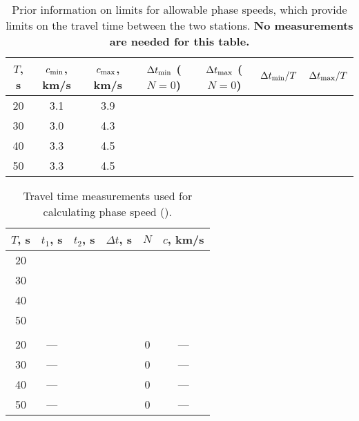 \documentclass[11pt,titlepage,fleqn]{article}
\begin{document}
\begin{table}[h]
\centering
\caption[]
{{
Prior information on limits for allowable phase speeds, which provide limits on the travel time between the two stations. {\bf No measurements are needed for this table.}
\label{tab:lims}
}}
\tgap
\begin{tabular}{|c|c|c|c|c|c|c|}
\hline
$T$, s & $c_{\rm min}$, km/s & $c_{\rm max}$, km/s & $\Delta t_{\rm min}$ ($N=0$) & $\Delta t_{\rm max}$ ($N=0$) & $\Delta t_{\rm min}/T$ & $\Delta t_{\rm max}/T$ \\ \hline
20 & 3.1 & 3.9 & \hspace{2cm} & \hspace{2cm} & \hspace{1cm} & \hspace{1cm} \\ \hline
30 & 3.0 & 4.3 & & & & \\ \hline
40 & 3.3 & 4.5 & & & & \\ \hline
50 & 3.3 & 4.5 & & & & \\ \hline
\end{tabular}
\end{table}

\begin{table}[h]
\centering
\caption[]
{{
Travel time measurements used for calculating phase speed ().
\label{tab:picks}
}}
\tgap
\begin{tabular}{|c|c|c|c|c|c|}
\hline
$T$, s & $t_1$, s & $t_2$, s & $\Delta t$, s & $N$ & $c$, km/s \\ \hline\hline
20 & \hspace{2cm} & \hspace{2cm} & \hspace{2cm} & \hspace{2cm} & \hspace{2cm} \\ \hline
30 & & & & & \\ \hline
40 & & & & & \\ \hline
50 & & & & & \\ \hline\hline
& & & & & \\ \hline\hline
20 & --- & \hspace{2cm} & \hspace{2cm} & 0 & --- \\ \hline
30 & --- & & & 0 & --- \\ \hline
40 & --- & & & 0 & --- \\ \hline
50 & --- & & & 0 & --- \\ \hline
\end{tabular}
\end{table}
\end{document}
